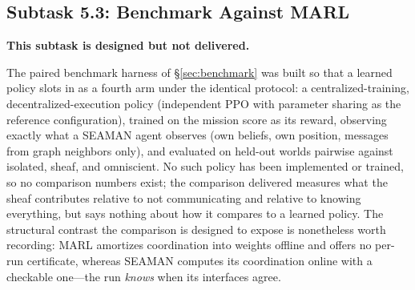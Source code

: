 \documentclass[11pt]{article}
\newif\ifshowcomments
\theoremstyle{definition}
\theoremstyle{remark}
\newcommand{\task}[1]{%
    \ifshowcomments
        ~\todo[inline, color=buzzgold!60, textcolor=black,caption={Task}]{{\bf Task:} #1}%
    \fi
}
\newcommand{\prompt}[1]{%
    \ifshowcomments
        ~\todo[inline, color=techgold!80, textcolor=black,caption={Task}]{{\bf Prompt:} #1}%
    \fi
}
\newcommand{\ai}[1]{%
    \ifshowcomments
        \noindent\textcolor{techred}{[AI Agent]: #1}%
    \fi
}
\begin{document}
\task{On return of the hardware results: append the returned video stills, report
the achieved outcomes against the simulated run, and confirm that the projected
interface colors and contested markers are legible in the overhead footage.}

\ai{\textbf{Closed.} The results returned on August 12, 2026 and are reported above; the
projection (tile fills, room boundaries, caption line) is legible in the returned footage, as
\Cref{fig:stills} shows. One caveat is recorded honestly: the testbed's JSON log was not
written, because a final diagnostic print crashed on a simulator-only attribute after the
experiment completed but before the log closed, so the tile-for-tile parity check is
approximated by the console-log comparison above rather than exact. The print is fixed
(guarded, and moved after the log close), so a resubmission would return the JSON; portal
confirmation numbers for the three submissions remain to be transcribed from the portal
account.}

\subsection{Subtask 5.3: Benchmark Against MARL}
\label{sec:marl}

\prompt{Implement a MARL baseline and compare its performance (e.g., time to completion,
efficiency) with SEAMAN under identical conditions. Deliverable: Benchmark analysis, part of
Milestone 4's report.}

\textbf{This subtask is designed but not delivered.}

The paired benchmark harness of \S\ref{sec:benchmark} was built so that a learned policy slots
in as a fourth arm under the identical protocol: a centralized-training, decentralized-execution
policy (independent PPO with parameter sharing as the reference configuration), trained on the
mission score as its reward, observing exactly what a SEAMAN agent observes (own beliefs, own
position, messages from graph neighbors only), and evaluated on held-out worlds pairwise
against \textsf{isolated}, \textsf{sheaf}, and \textsf{omniscient}.
No such policy has been implemented or trained, so no comparison numbers exist; the comparison
delivered measures what the sheaf contributes relative to not communicating and relative to
knowing everything, but says nothing about how it compares to a learned policy.
The structural contrast the comparison is designed to expose is nonetheless worth recording:
MARL amortizes coordination into weights offline and offers no per-run certificate, whereas
SEAMAN computes its coordination online with a checkable one---the run \emph{knows} when its
interfaces agree.
\end{document}
